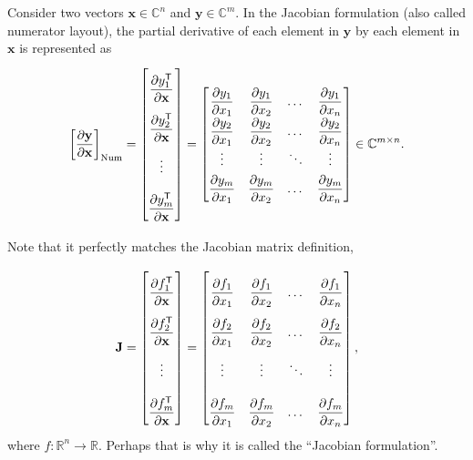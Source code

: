\documentclass{article}
\newcommand{\trans}{\mathsf{T}}
\begin{document}
Consider two vectors \(\mathbf{x} \in \mathbb{C}^n\) and \(\mathbf{y} \in \mathbb{C}^m\). In the Jacobian formulation (also called numerator layout), the partial derivative of each element in \(\mathbf{y}\) by each element in \(\mathbf{x}\) is represented as
\begin{align}
    \left[ \dfrac{\partial \mathbf{y}}{\partial \mathbf{x}} \right]_{\textnormal{Num}} = \renewcommand{\arraystretch}{2.6} \begin{bmatrix}
        \dfrac{\partial y_1^\trans}{\partial \mathbf{x}} \\
        \dfrac{\partial y_2^\trans}{\partial \mathbf{x}} \\ 
        \vdots \\ 
        \dfrac{\partial y_m^\trans}{\partial \mathbf{x}}
    \end{bmatrix} = \renewcommand{\arraystretch}{1.8}
    \begin{bmatrix}
        \dfrac{\partial y_1}{\partial x_1} & \dfrac{\partial y_1}{\partial x_2} & \dots & \dfrac{\partial y_1}{\partial x_n} \\
        \dfrac{\partial y_2}{\partial x_1} & \dfrac{\partial y_2}{\partial x_2} & \dots & \dfrac{\partial y_2}{\partial x_n} \\
        \vdots & \vdots & \ddots & \vdots \\
        \dfrac{\partial y_m}{\partial x_1} & \dfrac{\partial y_m}{\partial x_2} & \dots & \dfrac{\partial y_m}{\partial x_n} \\
    \end{bmatrix} \in \mathbb{C}^{m\times n}.
\end{align}

Note that it perfectly matches the Jacobian matrix definition,

\begin{align}
    \mathbf{J} = \renewcommand{\arraystretch}{2.6} \begin{bmatrix}
        \dfrac{\partial f_1^\trans}{\partial \mathbf{x}} \\
        \dfrac{\partial f_2^\trans}{\partial \mathbf{x}} \\ 
        \vdots \\ 
        \dfrac{\partial f_m^\trans}{\partial \mathbf{x}}
    \end{bmatrix} = \begin{bmatrix}
        \dfrac{\partial f_1}{\partial x_1} & \dfrac{\partial f_1}{\partial x_2} & \dots & \dfrac{\partial f_1}{\partial x_n} \\
        \dfrac{\partial f_2}{\partial x_1} & \dfrac{\partial f_2}{\partial x_2} & \dots & \dfrac{\partial f_2}{\partial x_n} \\
        \vdots & \vdots & \ddots & \vdots \\
        \dfrac{\partial f_m}{\partial x_1} & \dfrac{\partial f_m}{\partial x_2} & \dots & \dfrac{\partial f_m}{\partial x_n} \\
    \end{bmatrix},
\end{align}
where \(f: \mathbb{R}^n \rightarrow \mathbb{R}\). Perhaps that is why it is called the ``Jacobian formulation''.
\end{document}
